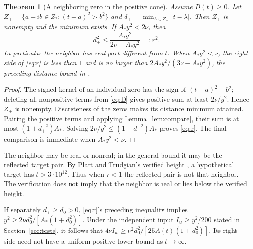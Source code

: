 \documentclass[11pt,a4paper]{article}
\newtheorem{theorem}{Theorem}[section]
\begin{document}
\begin{theorem}[A neighboring zero in the positive cone]\label{thm:cone}
Assume $D(t)\ge0$. Let $Z_+=\{a+ib\in Z_*:(t-a)^2>b^2\}$ and $d_+=\min_{\lambda\in Z_+}|t-\lambda|$. Then $Z_+$ is nonempty and the minimum exists. If $A_*y^2<2\nu$, then
\begin{equation}\label{eq:r}
 d_+^2\le \frac{A_*y^2}{2\nu-A_*y^2}=:r^2.
\end{equation}
In particular the neighbor has real part different from $t$. When $A_*y^2<\nu$, the right side of \eqref{eq:r} is less than $1$ and is no larger than $2A_*y^2/(3\nu-A_*y^2)$, the preceding distance bound in \cite{laguerre}.
\end{theorem}
\begin{proof}
The signed kernel of an individual zero has the sign of $(t-a)^2-b^2$; deleting all nonpositive terms from \eqref{eq:D} gives positive sum at least $2\nu/y^2$. Hence $Z_+$ is nonempty. Discreteness of the zeros makes its distance minimum attained. Pairing the positive terms and applying Lemma~\ref{lem:compare}, their sum is at most $(1+d_+^{-2})A_*$. Solving $2\nu/y^2\le(1+d_+^{-2})A_*$ proves \eqref{eq:r}. The final comparison is immediate when $A_*y^2<\nu$.
\end{proof}
The neighbor may be real or nonreal; in the general bound it may be the reflected target pair. By Platt and Trudgian's verified height \cite{Platt}, a hypothetical target has $t>3\cdot10^{12}$. Thus when $r<1$ the reflected pair is not that neighbor. The verification does not imply that the neighbor is real or lies below the verified height.

If separately $d_+\ge d_0>0$, \eqref{eq:r}'s preceding inequality implies $y^2\ge 2\nu d_0^2/[A_*(1+d_0^2)]$. Under the independent input $I_w\ge y^2/200$ stated in Section~\ref{sec:tests}, it follows that $4\nu I_w\ge\nu^2d_0^2/[25A(t)(1+d_0^2)]$. Its right side need not have a uniform positive lower bound as $t\to\infty$.
\end{document}
